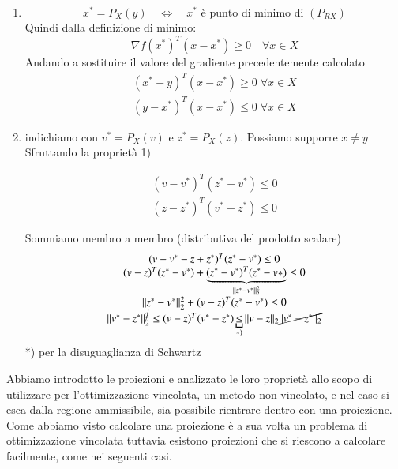 \begin{thproof}
  \begin{enumerate}
  \item $$ x^{*} = P_{X}(y) \quad \Longleftrightarrow \quad
    x^{*} \text{ \`e punto di minimo di } (P_{RX}) $$
    Quindi dalla definizione di minimo:
    $$ \nabla f(x^{*})^{T} (x - x^{*}) \geq 0 \quad \forall x \in X $$
    Andando a sostituire il valore del gradiente precedentemente calcolato
    \[\begin{array}{l}
      (x^{*} - y)^{T} (x - x^{*}) \geq 0 \; \forall x \in X \\
      (y - x^{*})^{T} (x - x^{*}) \leq 0 \; \forall x \in X
    \end{array}\]

  \item indichiamo con $v^{*} = P_{X}(v)$ e $z^{*} = P_{X}(z)$. Possiamo supporre $x \neq y$ \\
    Sfruttando la propriet\`a 1)
    
    \[\begin{array}{l}
      (v - v^{*})^{T} (z^{*} - v^{*}) \leq 0 \\
      (z - z^{*})^{T} (v^{*} - z^{*}) \leq 0 
    \end{array}\]
    
    Sommiamo membro a membro (distributiva del prodotto scalare)
    $$
    \begin{array}{c}
      (v - v^{*} - z + z^{*})^{T}(z^{*} - v^{*}) \leq 0 \\
      (v - z)^{T}(z^* - v^*) + \underbrace{(z^* - v^*)^{T}(z^* -
        v*)}_{||z^* - v^*||_2^2} \leq 0 \\
      || z^{*} - v^{*}||_{2}^{2} + (v - z)^{T}(z^{*} - v^{*}) \leq 0 \\
      || v^{*} - z^{*}||_{2}^{\cancel{2}} \leq
      (v - z)^{T} (v^{*} - z^{*}) \underbracket{\leq}_{*)}
      ||v - z ||_{2} \cancel{||v^{*} -z^{*}||_{2}}
    \end{array}
    $$
    *) per la disuguaglianza di Schwartz
  \end{enumerate}
\end{thproof}

Abbiamo introdotto le proiezioni e analizzato le loro proprietà allo
scopo di utilizzare per l'ottimizzazione vincolata, un metodo non
vincolato, e nel caso si esca dalla regione ammissibile, sia possibile
rientrare dentro con una proiezione.\\
Come abbiamo visto calcolare una proiezione è a sua volta un problema
di ottimizzazione vincolata tuttavia esistono proiezioni che si
riescono a calcolare facilmente, come nei seguenti casi.

